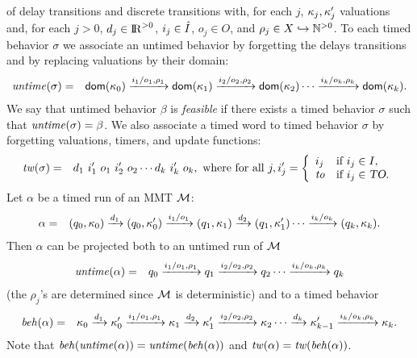 of delay transitions and discrete transitions with, for each $j$,
$\kappa_j, \kappa'_j$ valuations and,
for each $j>0$,  $d_j \in {\rm I\!R}^{> 0}$, $i_j \in \hat{I}$, $o_j \in O$, and $\rho_j \in X \hookrightarrow {\mathbb N}^{>0}$.
To each timed behavior $\sigma$ we associate an untimed behavior by forgetting the
delays transitions and by replacing valuations by their domain:
\begin{eqnarray*}
\mathit{untime}(\sigma) & = & {\textsf{dom}}(\kappa_0) \xrightarrow{i_1/o_1, \rho_1} {\textsf{dom}}(\kappa_1)  \xrightarrow{i_2/o_2, \rho_2} {\textsf{dom}}(\kappa_2) \cdots \xrightarrow{i_k/o_k, \rho_k} {\textsf{dom}}(\kappa_k).
\end{eqnarray*}
We say that untimed behavior $\beta$ is \emph{feasible} if there exists a timed behavior $\sigma$ such that $\mathit{untime}(\sigma) = \beta$.
We also associate a timed word to timed behavior $\sigma$ by forgetting valuations, timers, and update functions:
\begin{eqnarray*}
\mathit{tw}(\sigma) & = & d_ 1 ~ i'_1 ~ o_1 ~ i'_2 ~ o_2 \cdots d_k ~ i'_k ~ o_k, \mbox{ where for all } j,
i'_j  =  \left\{ \begin{array}{ll}
i_j & \mbox{if } i_j \in I,\\
\mathit{to} & \mbox{if } i_j \in \mbox{\sl TO}.
\end{array} \right.
\end{eqnarray*} 
Let $\alpha$ be a timed run of an MMT ${\cal M}$: 
\begin{eqnarray*}
\alpha & = & (q_0, \kappa_0) \xrightarrow{d_1} (q_0, \kappa'_0) \xrightarrow{i_1/o_1} (q_1, \kappa_1) \xrightarrow{d_2} (q_1, \kappa'_1)  \cdots
 \xrightarrow{i_k/o_k} (q_k, \kappa_k).
\end{eqnarray*}
Then $\alpha$ can be projected both to an untimed run of ${\cal M}$
\begin{eqnarray*}
\mathit{untime} (\alpha) & = & q_0 \xrightarrow{i_1/o_1, \rho_1} q_1  \xrightarrow{i_2/o_2, \rho_2} q_2 \cdots \xrightarrow{i_k/o_k, \rho_k} q_k
\end{eqnarray*}
(the $\rho_j$'s are determined since ${\cal M}$ is deterministic) and to a timed behavior
\begin{eqnarray*}
\mathit{beh}(\alpha) & = & \kappa_0 \xrightarrow{d_1} \kappa'_0 \xrightarrow{i_1/o_1, \rho_1} \kappa_1 \xrightarrow{d_2} \kappa'_1 \xrightarrow{i_2/o_2, \rho_2} \kappa_2 \cdots
\xrightarrow{d_k} \kappa'_{k-1} \xrightarrow{i_k/o_k, \rho_k} \kappa_{k}.
\end{eqnarray*}
Note that $\mathit{beh}(\mathit{untime}(\alpha))=\mathit{untime}(\mathit{beh}(\alpha))$ and $\mathit{tw}(\alpha) = \mathit{tw}(\mathit{beh}(\alpha))$.
\iflong
